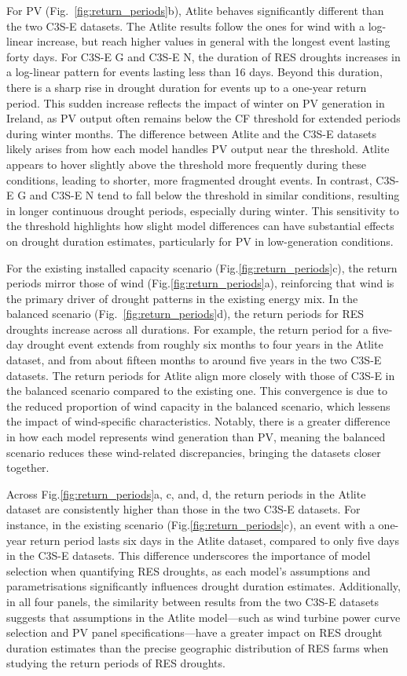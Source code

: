 \documentclass[a4paper, 11pt]{article}
\begin{document}
For PV (Fig.~\ref{fig:return_periods}b), Atlite behaves significantly different than the two C3S-E datasets. The Atlite results follow the ones for wind with a log-linear increase, but reach higher values in general with the longest event lasting forty days. For C3S-E G and C3S-E N, the duration of RES droughts increases in a log-linear pattern for events lasting less than 16 days. Beyond this duration, there is a sharp rise in drought duration for events up to a one-year return period. This sudden increase reflects the impact of winter on PV generation in Ireland, as PV output often remains below the CF threshold for extended periods during winter months. The difference between Atlite and the C3S-E datasets likely arises from how each model handles PV output near the threshold. Atlite appears to hover slightly above the threshold more frequently during these conditions, leading to shorter, more fragmented drought events. In contrast, C3S-E G and C3S-E N tend to fall below the threshold in similar conditions, resulting in longer continuous drought periods, especially during winter. This sensitivity to the threshold highlights how slight model differences can have substantial effects on drought duration estimates, particularly for PV in low-generation conditions.

For the existing installed capacity scenario (Fig.\ref{fig:return_periods}c), the return periods mirror those of wind (Fig.\ref{fig:return_periods}a), reinforcing that wind is the primary driver of drought patterns in the existing energy mix. In the balanced scenario (Fig.~\ref{fig:return_periods}d), the return periods for RES droughts increase across all durations. For example, the return period for a five-day drought event extends from roughly six months to four years in the Atlite dataset, and from about fifteen months to around five years in the two C3S-E datasets. The return periods for Atlite align more closely with those of C3S-E in the balanced scenario compared to the existing one. This convergence is due to the reduced proportion of wind capacity in the balanced scenario, which lessens the impact of wind-specific characteristics. Notably, there is a greater difference in how each model represents wind generation than PV, meaning the balanced scenario reduces these wind-related discrepancies, bringing the datasets closer together.
 
Across Fig.\ref{fig:return_periods}a, c, and, d, the return periods in the Atlite dataset are consistently higher than those in the two C3S-E datasets. For instance, in the existing scenario (Fig.\ref{fig:return_periods}c), an event with a one-year return period lasts six days in the Atlite dataset, compared to only five days in the C3S-E datasets. This difference underscores the importance of model selection when quantifying RES droughts, as each model’s assumptions and parametrisations significantly influences drought duration estimates. Additionally, in all four panels, the similarity between results from the two C3S-E datasets suggests that assumptions in the Atlite model—such as wind turbine power curve selection and PV panel specifications—have a greater impact on RES drought duration estimates than the precise geographic distribution of RES farms when studying the return periods of RES droughts.
\end{document}
